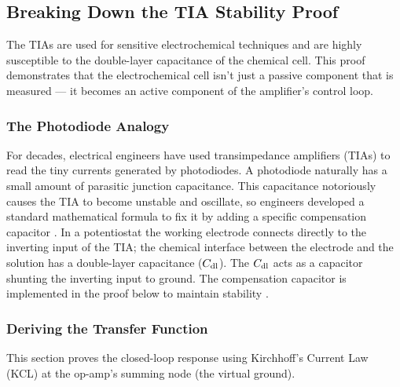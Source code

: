 \subsection{Breaking Down the TIA Stability Proof}
\label{sec:tia-stability}
 
The TIAs are used for sensitive electrochemical techniques and are highly susceptible to the double-layer capacitance of the chemical cell. This proof demonstrates that the electrochemical cell isn't just a passive component that is measured --- it becomes an active component of the amplifier's control loop.
 
\subsubsection{The Photodiode Analogy}
\label{sec:photodiode-analogy}
 
For decades, electrical engineers have used transimpedance amplifiers (TIAs) to read the tiny currents generated by photodiodes. A photodiode naturally has a small amount of parasitic junction capacitance. This capacitance notoriously causes the TIA to become unstable and oscillate, so engineers developed a standard mathematical formula to fix it by adding a specific compensation capacitor \cite{graeme1996photodiode}. In a potentiostat the working electrode connects directly to the inverting input of the TIA; the chemical interface between the electrode and the solution has a double-layer capacitance ($C_{\mathrm{dl}}$). The $C_{\mathrm{dl}}$ acts as a capacitor shunting the inverting input to ground. The compensation capacitor is implemented in the proof below to maintain stability \cite{graeme1996photodiode}.
 
\subsubsection{Deriving the Transfer Function}
\label{sec:tia-tf-derivation}
 
This section proves the closed-loop response using Kirchhoff's Current Law (KCL) at the op-amp's summing node (the virtual ground).


